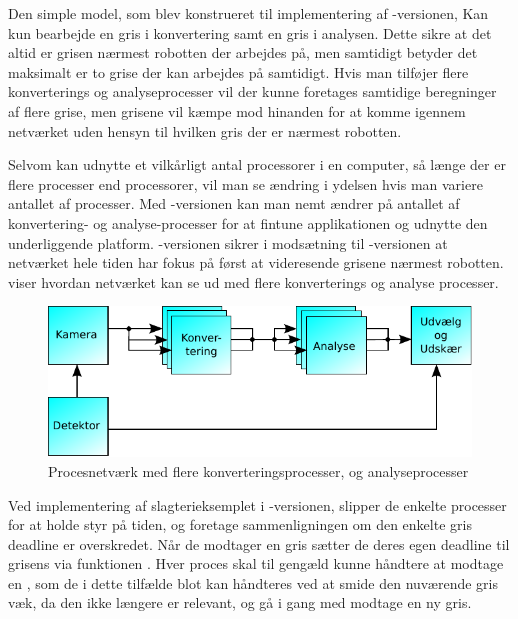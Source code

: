Den simple model, som blev konstrueret til implementering af -versionen, Kan kun bearbejde en gris i konvertering samt en gris i analysen. Dette sikre at det altid er grisen nærmest robotten der arbejdes på, men samtidigt betyder det maksimalt er  to grise der kan arbejdes på samtidigt. Hvis man 
 tilføjer flere konverterings og analyseprocesser vil der kunne foretages samtidige beregninger af flere grise, men grisene vil kæmpe mod hinanden for at komme igennem netværket uden hensyn til hvilken gris der er nærmest robotten.

Selvom \pycsp kan udnytte et vilkårligt antal processorer i en computer, så længe der er flere processer end processorer, vil man se ændring i ydelsen hvis man variere  antallet af processer. Med -versionen kan man nemt ændrer på antallet af konvertering- og analyse-processer for at fintune applikationen og  udnytte den underliggende platform. -versionen sikrer i modsætning til -versionen at netværket hele tiden har fokus på først at videresende grisene nærmest robotten.  viser hvordan netværket kan se ud med flere konverterings og analyse processer. 

\begin{figure}
 \begin{center}
  \includegraphics[scale=1]{images/pig-network3}
	\caption{Procesnetværk med flere konverteringsprocesser, og analyseprocesser}
	\label{fig:pig-network3}
\end{center}
\end{figure}

Ved implementering af slagterieksemplet i -versionen, slipper de enkelte processer for at holde styr på tiden, og foretage sammenligningen om den enkelte gris deadline er overskredet. Når de modtager en gris sætter de deres egen deadline til grisens via funktionen .  Hver proces skal til gengæld kunne håndtere at modtage en , som de i dette tilfælde blot kan håndteres ved at smide den nuværende gris væk, da den ikke længere er relevant, og  gå i gang med modtage en ny gris.

